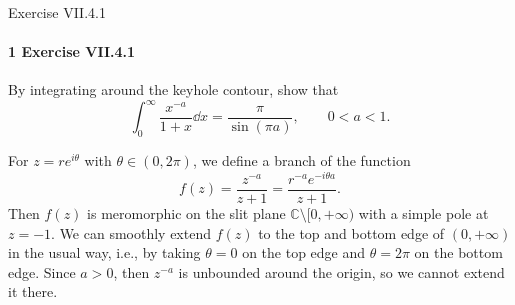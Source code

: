 \documentclass[12pt]{article}
\newenvironment{fullbox}{\begin{lrbox}{\savefullbox}\begin{minipage}{\dimexpr\textwidth-2\fboxsep\relax}}{\end{minipage}\end{lrbox}\begin{center}\framebox[\textwidth]{\usebox{\savefullbox}}\end{center}}
\newenvironment{pbox}[1][]{\begin{fullbox}\ifx#1\empty\else\paragraph{#1}\fi}{\end{fullbox}}
\theoremstyle{definition}
\newcommand{\C}{\mathbb{C}}
\begin{document}
\thispagestyle{title}


\begin{pbox}[1 Exercise VII.4.1]
    By integrating around the keyhole contour, show that
    \[
        \int_{0}^{\infty} \frac{x^{-a}}{1 + x} \dd{x} = \frac{\pi}{\sin(\pi a)}, \qquad 0 < a < 1.
    \]
\end{pbox}

For $z = r e^{i\theta}$ with $\theta \in (0, 2\pi)$, we define a branch of the function
\[
    f(z)
        = \frac{z^{-a}}{z + 1}
        = \frac{r^{-a}e^{-i\theta a}}{z + 1}.
\]
Then $f(z)$ is meromorphic on the slit plane $\C \setminus [0, +\infty)$ with a simple pole at $z = -1$. We can smoothly extend $f(z)$ to the top and bottom edge of $(0, +\infty)$ in the usual way, i.e., by taking $\theta = 0$ on the top edge and $\theta = 2\pi$ on the bottom edge. Since $a > 0$, then $z^{-a}$ is unbounded around the origin, so we cannot extend it there.
\end{document}
